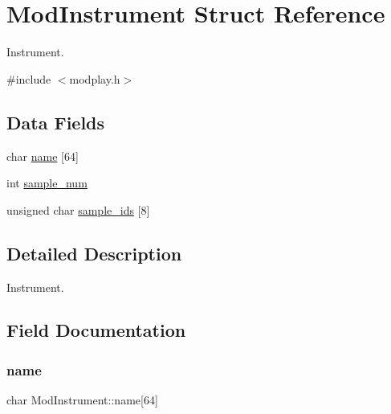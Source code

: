 \hypertarget{structModInstrument}{}\section{Mod\+Instrument Struct Reference}
\label{structModInstrument}


Instrument.  




{\ttfamily \#include $<$modplay.\+h$>$}

\subsection*{Data Fields}
\begin{DoxyCompactItemize}
\item 
char \hyperlink{structModInstrument_a8899319af20e4bed433fcc8f80443035}{name} \mbox{[}64\mbox{]}
\item 
int \hyperlink{structModInstrument_a573f5fd3a0901038aa7cf4594429a0ca}{sample\+\_\+num}
\item 
unsigned char \hyperlink{structModInstrument_a21ed8c8ded375bbd6edf8654502d1827}{sample\+\_\+ids} \mbox{[}8\mbox{]}
\end{DoxyCompactItemize}


\subsection{Detailed Description}
Instrument. 



\subsection{Field Documentation}
\mbox{\label{structModInstrument_a8899319af20e4bed433fcc8f80443035}} 
\subsubsection{\texorpdfstring{name}{name}}
{\footnotesize\ttfamily char Mod\+Instrument\+::name\mbox{[}64\mbox{]}}

\mbox{\label{structModInstrument_a21ed8c8ded375bbd6edf8654502d1827}} 
